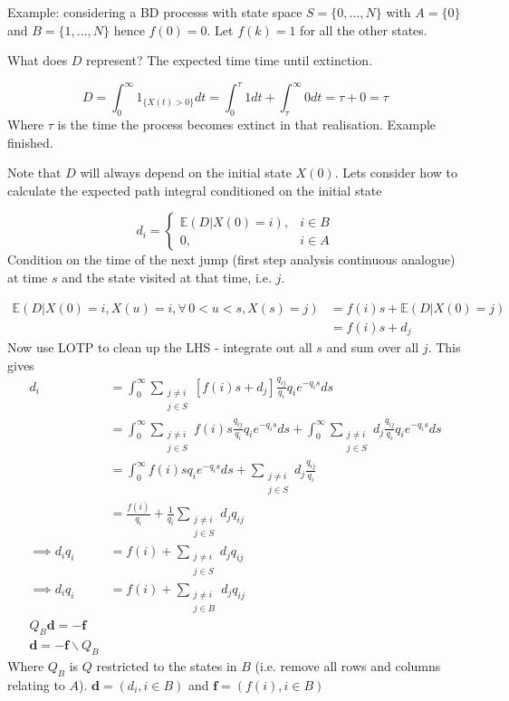 \documentclass{/home/janmebows/Documents/LatexTemplates/myassignment}
\begin{document}
Example: considering a BD processs with state space $S = \{0,\ldots,N\}$ with $A = \{0\}$ and $B = \{1,\ldots,N\}$ hence $f(0) = 0$.
Let $f(k) = 1$ for all the other states.

What does $D$ represent? The expected time time until extinction.

\[D = \int_0^\infty 1_{\{X(t) >0\}} dt = \int_0^\tau 1 dt + \int_\tau^\infty 0 dt = \tau +0 =\tau\]
Where $\tau$ is the time the process becomes extinct in that realisation. Example finished.

Note that $D$ will always depend on the initial state $X(0)$.
Lets consider how to calculate the expected path integral conditioned on the initial state

\[d_i = \begin{cases}
        \mathbb{E}\left(D | X(0) = i\right), &i \in B\\
        0,&i \in A
    \end{cases}\]
Condition on the time of the next jump (first step analysis continuous analogue) at time $s$ and the state visited at that time, i.e. $j$.

\begin{align*}
\mathbb{E}\left(D | X(0) = i, X(u) = i, \forall\, 0<u<s, X(s) = j\right)&= f(i)s + \mathbb{E}(D|X(0)=j)\\
        &= f(i)s + d_j
\end{align*}
Now use LOTP to clean up the LHS - integrate out all $s$ and sum over all $j$. This gives
\begin{align*}
d_i &= \int_0^\infty\sum_{\substack{j\neq i\\j \in S}}\left[f(i)s + d_j\right]\frac{q_{ij}}{q_i}q_i e^{-q_i s} ds\\
&=\int_0^\infty\sum_{\substack{j\neq i\\j \in S}}f(i)s\frac{q_{ij}}{q_i}q_i e^{-q_i s} ds +\int_0^\infty\sum_{\substack{j\neq i\\j \in S}}d_j\frac{q_{ij}}{q_i}q_i e^{-q_i s} ds  \\
&=\int_0^\infty f(i)s q_i e^{-q_i s} ds +\sum_{\substack{j\neq i\\j \in S}}d_j\frac{q_{ij}}{q_i}\\
&=\frac{f(i)}{q_i} + \frac1{q_i} \sum_{\substack{j\neq i\\j \in S}} d_j q_{ij}\\
\implies d_iq_i &= f(i) +  \sum_{\substack{j\neq i\\j \in S}} d_j q_{ij}\\
\implies d_iq_i &= f(i) +  \sum_{\substack{j\neq i\\j \in B}} d_j q_{ij}\\
Q_B \mathbf{d} = - \mathbf{f}\\
\mathbf{d} = -\mathbf{f} \backslash Q_B
\end{align*}
Where $Q_B$ is $Q$ restricted to the states in $B$ (i.e. remove all rows and columns relating to $A$). $\mathbf{d} = (d_i,i\in B)$ and $\mathbf{f} = (f(i),i\in B)$
\end{document}
